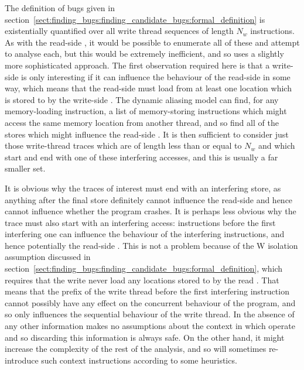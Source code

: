 The definition of bugs given in
section~\ref{sect:finding_bugs:finding_candidate_bugs:formal_definition}
is existentially quantified over all write thread sequences of length
$N_w$ instructions.  As with the read-side {\StateMachines}, it would
be possible to enumerate all of these and attempt to analyse each, but
this would be extremely inefficient, and so {\technique} uses a
slightly more sophisticated approach.  The first observation required
here is that a write-side {\StateMachine} is only interesting if it
can influence the behaviour of the read-side {\StateMachine} in some
way, which means that the read-side {\StateMachine} must load from at
least one location which is stored to by the write-side
{\StateMachine}.  The dynamic aliasing model can find, for any
memory-loading instruction, a list of memory-storing instructions
which might access the same memory location from another thread, and
so find all of the stores which might influence the read-side
{\StateMachine}.  It is then sufficient to consider just those
write-thread traces which are of length less than or equal to $N_w$
and which start and end with one of these interfering accesses, and
this is usually a far smaller set.

It is obvious why the traces of interest must end with an interfering
store, as anything after the final store definitely cannot influence
the read-side {\StateMachine} and hence cannot influence whether the
program crashes.  It is perhaps less obvious why the trace must also
start with an interfering access: instructions before the first
interfering one can influence the behaviour of the interfering
instructions, and hence potentially the read-side {\StateMachine}.
This is not a problem because of the W isolation assumption discussed
in
section~\ref{sect:finding_bugs:finding_candidate_bugs:formal_definition},
which requires that the write {\StateMachine} never load any locations
stored to by the read {\StateMachine}.  That means that the prefix of
the write thread before the first interfering instruction cannot
possibly have any effect on the concurrent behaviour of the program,
and so only influences the sequential behaviour of the write thread.
In the absence of any other information {\technique} makes no
assumptions about the context in which {\StateMachines} operate and so
discarding this information is always safe.  On the other hand, it
might increase the complexity of the rest of the analysis, and so
{\implementation} will sometimes re-introduce such context
instructions according to some heuristics.  

